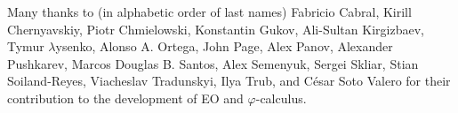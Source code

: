 \documentclass[sigplan,nonacm=true]{acmart}
\newcommand\nospell[1]{#1}
\theoremstyle{theorems}
\newcommand{\phic}{{$\varphi$-calculus}}
\newcommand{\eo}{{\sffamily EO}}
\begin{document}
Many thanks to (in alphabetic order of last names)
  \nospell{Fabricio Cabral},
  \nospell{Kirill Chernyavskiy},
  \nospell{Piotr Chmielowski},
  \nospell{Konstantin Gukov},
  \nospell{Ali-Sultan Kirgizbaev},
  \nospell{Tymur $\lambda$ysenko},
  \nospell{Alonso A. Ortega},
  \nospell{John Page},
  \nospell{Alex Panov},
  \nospell{Alexander Pushkarev},
  \nospell{Marcos Douglas B. Santos},
  \nospell{Alex Semenyuk},
  \nospell{Sergei Skliar},
  \nospell{Stian Soiland-Reyes},
  \nospell{Viacheslav Tradunskyi},
  \nospell{Ilya Trub},
  and
  \nospell{César Soto Valero}
for their contribution to the development of \eo{} and \phic{}.


\raggedright

\clearpage
\end{document}
